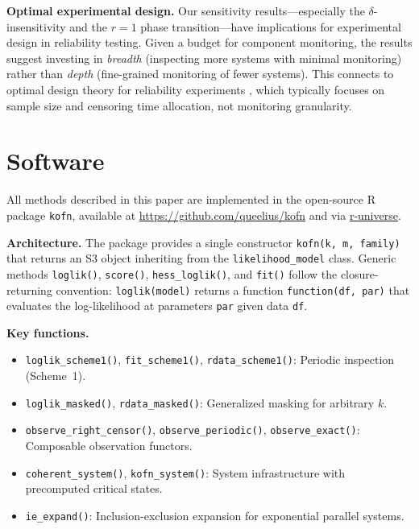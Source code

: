 \documentclass[12pt]{article}
\begin{document}
\textbf{Optimal experimental design.}
Our sensitivity results---especially the $\delta$-insensitivity and the
$r = 1$ phase transition---have implications for experimental design in
reliability testing.  Given a budget for component monitoring,
the results suggest investing in \emph{breadth} (inspecting more systems
with minimal monitoring) rather than \emph{depth} (fine-grained monitoring
of fewer systems).  This connects to optimal design theory for reliability
experiments \citep{AtkinsonDonev1992}, which typically focuses on sample
size and censoring time allocation, not monitoring granularity.


\section{Software}\label{sec:software}

All methods described in this paper are implemented in the open-source R
package \texttt{kofn}, available at
\url{https://github.com/queelius/kofn} and via
\href{https://queelius.r-universe.dev}{r-universe}.

\textbf{Architecture.}
The package provides a single constructor \texttt{kofn(k, m, family)}
that returns an S3 object inheriting from the \texttt{likelihood\_model}
class.  Generic methods \texttt{loglik()}, \texttt{score()},
\texttt{hess\_loglik()}, and \texttt{fit()} follow the closure-returning
convention: \texttt{loglik(model)} returns a function
\texttt{function(df, par)} that evaluates the log-likelihood at
parameters \texttt{par} given data \texttt{df}.

\textbf{Key functions.}
\begin{itemize}
  \item \texttt{loglik\_scheme1()}, \texttt{fit\_scheme1()},
    \texttt{rdata\_scheme1()}: Periodic inspection (Scheme~1).
  \item \texttt{loglik\_masked()}, \texttt{rdata\_masked()}: Generalized
    masking for arbitrary $k$.
  \item \texttt{observe\_right\_censor()}, \texttt{observe\_periodic()},
    \texttt{observe\_exact()}: Composable observation functors.
  \item \texttt{coherent\_system()}, \texttt{kofn\_system()}: System
    infrastructure with precomputed critical states.
  \item \texttt{ie\_expand()}: Inclusion-exclusion expansion for
    exponential parallel systems.
\end{itemize}
\end{document}
